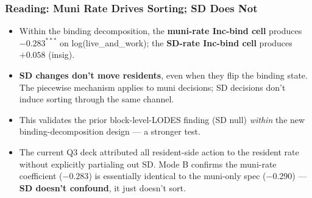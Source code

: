 \documentclass[xcolor = x11names, compress, aspectratio = 169]{beamer}
\begin{document}
    \begin{frame}
    \frametitle{Reading: Muni Rate Drives Sorting; SD Does Not}
        \footnotesize
        \begin{itemize}\setlength{\itemsep}{0.10cm}
            \item Within the binding decomposition, the \textbf{muni-rate
            Inc-bind cell} produces $-0.283^{***}$ on log(live\_and\_work);
            the \textbf{SD-rate Inc-bind cell} produces $+0.058$ (insig).
            \item \textbf{SD changes don't move residents}, even when
            they flip the binding state. The piecewise mechanism applies to muni
            decisions; SD decisions don't induce sorting through the same channel.
            \item This validates the prior block-level-LODES finding (SD null)
            \emph{within} the new binding-decomposition design --- a stronger test.
            \item The current Q3 deck attributed all resident-side action to
            the resident rate without explicitly partialing out SD.
            Mode B confirms the muni-rate coefficient ($-0.283$) is
            essentially identical to the muni-only spec ($-0.290$) ---
            \textbf{SD doesn't confound}, it just doesn't sort.
        \end{itemize}
    \end{frame}
\end{document}
